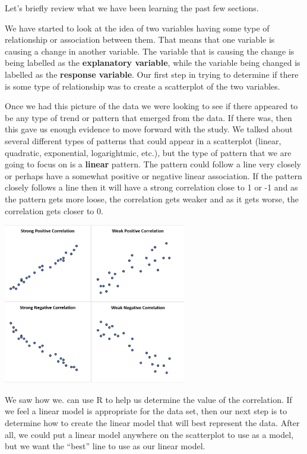 \documentclass[
  letterpaper,
  DIV=11,
  numbers=noendperiod]{scrreprt}
\begin{document}

Let's briefly review what we have been learning the past few sections.

We have started to look at the idea of two variables having some type of
relationship or association between them. That means that one variable
is causing a change in another variable. The variable that is causing
the change is being labelled as the \textbf{explanatory variable}, while
the variable being changed is labelled as the \textbf{response
variable}. Our first step in trying to determine if there is some type
of relationship was to create a scatterplot of the two variables.

Once we had this picture of the data we were looking to see if there
appeared to be any type of trend or pattern that emerged from the data.
If there was, then this gave us enough evidence to move forward with the
study. We talked about several different types of patterns that could
appear in a scatterplot (linear, quadratic, exponential, logarightmic,
etc.), but the type of pattern that we are going to focus on is a
\textbf{linear} pattern. The pattern could follow a line very closely or
perhaps have a somewhat positive or negative linear association. If the
pattern closely follows a line then it will have a strong correlation
close to 1 or -1 and as the pattern gets more loose, the correlation
gets weaker and as it gets worse, the correlation gets closer to 0.

\includegraphics[width=0.6\textwidth,height=\textheight]{./images/LMR_1.jpg}

We saw how we. can use R to help us determine the value of the
correlation. If we feel a linear model is appropriate for the data set,
then our next step is to determine how to create the linear model that
will best represent the data. After all, we could put a linear model
anywhere on the scatterplot to use as a model, but we want the ``best''
line to use as our linear model.
\end{document}
